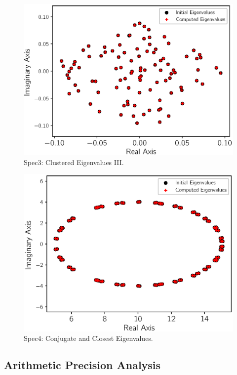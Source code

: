 \begin{figure}[htbp]
	\centering
	\includegraphics[width=5.8in]{fig/matgen/vector3.eps}
	\caption{Spec3: Clustered Eigenvalues III.}
	\label{fig_third_case}
\end{figure}

\begin{figure}[htbp]
	\centering
	\includegraphics[width=5.8in]{fig/matgen/vector5.eps}
	\caption{Spec4: Conjugate and Closest Eigenvalues.}
	\label{fig_forth_case}
\end{figure}

\subsection{Arithmetic Precision Analysis}

